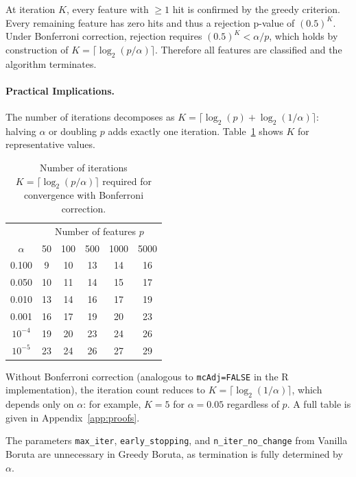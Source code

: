 \documentclass[runningheads]{llncs}
\begin{document}
At iteration $K$, every feature with $\geq 1$ hit is confirmed by the greedy criterion. Every remaining feature has zero hits and thus a rejection p-value of $(0.5)^K$. Under Bonferroni correction, rejection requires $(0.5)^K < \alpha/p$, which holds by construction of $K = \lceil \log_2(p/\alpha) \rceil$. Therefore all features are classified and the algorithm terminates.

\paragraph{Practical Implications.}
The number of iterations decomposes as $K = \lceil \log_2(p) + \log_2(1/\alpha) \rceil$: halving $\alpha$ or doubling $p$ adds exactly one iteration. Table~\ref{tab:iterations_alpha} shows $K$ for representative values.

\begin{table}[h]
\centering
\caption{Number of iterations $K = \lceil \log_2(p/\alpha) \rceil$ required for convergence with Bonferroni correction.}
\label{tab:iterations_alpha}
\begin{tabular}{c|ccccc}
\toprule
& \multicolumn{5}{c}{Number of features $p$} \\
$\alpha$ & 50 & 100 & 500 & 1000 & 5000 \\
\midrule
0.100 & 9 & 10 & 13 & 14 & 16 \\
0.050 & 10 & 11 & 14 & 15 & 17 \\
0.010 & 13 & 14 & 16 & 17 & 19 \\
0.001 & 16 & 17 & 19 & 20 & 23 \\
$10^{-4}$ & 19 & 20 & 23 & 24 & 26 \\
$10^{-5}$ & 23 & 24 & 26 & 27 & 29 \\
\bottomrule
\end{tabular}
\end{table}

\noindent Without Bonferroni correction (analogous to \texttt{mcAdj=FALSE} in the R implementation), the iteration count reduces to $K = \lceil \log_2(1/\alpha) \rceil$, which depends only on $\alpha$: for example, $K=5$ for $\alpha=0.05$ regardless of $p$. A full table is given in Appendix~\ref{app:proofs}.

\begin{corollary}
\label{cor:hyperparams}
The parameters \texttt{max\_iter}, \texttt{early\_stopping}, and \texttt{n\_iter\_no\_change} from Vanilla Boruta are unnecessary in Greedy Boruta, as termination is fully determined by $\alpha$.
\end{corollary}
\end{document}
